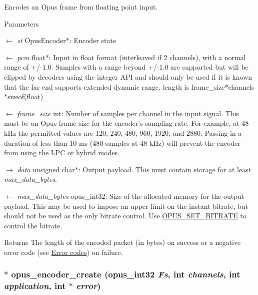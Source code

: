 Encodes an Opus frame from floating point input. 
\begin{DoxyParams}{Parameters}
\item[\mbox{$\leftarrow$} {\em st}]{\ttfamily OpusEncoder$\ast$}: Encoder state \item[\mbox{$\leftarrow$} {\em pcm}]{\ttfamily float$\ast$}: Input in float format (interleaved if 2 channels), with a normal range of +/-\/1.0. Samples with a range beyond +/-\/1.0 are supported but will be clipped by decoders using the integer API and should only be used if it is known that the far end supports extended dynamic range. length is frame\_\-size$\ast$channels$\ast$sizeof(float) \item[\mbox{$\leftarrow$} {\em frame\_\-size}]{\ttfamily int}: Number of samples per channel in the input signal. This must be an Opus frame size for the encoder's sampling rate. For example, at 48 kHz the permitted values are 120, 240, 480, 960, 1920, and 2880. Passing in a duration of less than 10 ms (480 samples at 48 kHz) will prevent the encoder from using the LPC or hybrid modes. \item[\mbox{$\rightarrow$} {\em data}]{\ttfamily unsigned char$\ast$}: Output payload. This must contain storage for at least {\itshape max\_\-data\_\-bytes\/}. \item[\mbox{$\leftarrow$} {\em max\_\-data\_\-bytes}]{\ttfamily opus\_\-int32}: Size of the allocated memory for the output payload. This may be used to impose an upper limit on the instant bitrate, but should not be used as the only bitrate control. Use \hyperlink{group__opus__encoderctls_ga0bb51947e355b33d0cb358463b5101a7}{OPUS\_\-SET\_\-BITRATE} to control the bitrate. \end{DoxyParams}
\begin{DoxyReturn}{Returns}
The length of the encoded packet (in bytes) on success or a negative error code (see \hyperlink{group__opus__errorcodes}{Error codes}) on failure. 
\end{DoxyReturn}
\hypertarget{group__opus__encoder_gaa89264fd93c9da70362a0c9b96b9ca88}{
\subsubsection[{opus\_\-encoder\_\-create}]{$\ast$ opus\_\-encoder\_\-create ({\bf opus\_\-int32} {\em Fs}, \/  int {\em channels}, \/  int {\em application}, \/  int $\ast$ {\em error})}}
\label{group__opus__encoder_gaa89264fd93c9da70362a0c9b96b9ca88}


